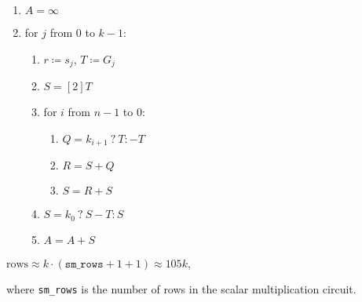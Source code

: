 \begin{enumerate}
	\item $A = \infty$
	\item for $j$ from $0$ to $k-1$:
	\begin{enumerate}
		\item $r \coloneqq s_j$, $T \coloneqq G_j$
		\item $S = [2]T$
		\item for $i$ from $n - 1$ to $0$:
		\begin{enumerate}
			\item $Q = k_{i + 1} \: ? \: T : -T$
			\item $R = S + Q$
			\item $S = R + S$
		\end{enumerate}
		\item $S = k_0 \: ? \: S - T : S$
		\item $A = A + S$
	\end{enumerate}
\end{enumerate}


\begin{center}
	$\text{rows} \approx k \cdot (\texttt{sm\_rows} + 1 + 1) \approx 105k$,
\end{center}
where \texttt{sm\_rows} is the number of rows in the scalar multiplication circuit. 

